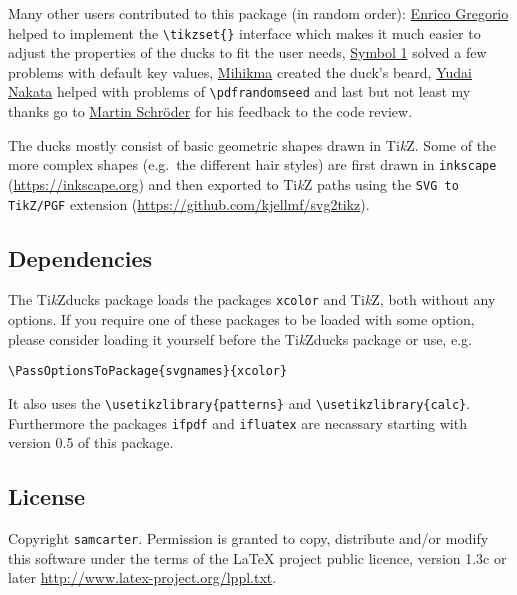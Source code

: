 \documentclass[parskip=half]{scrartcl}
\newcommand{\TikZ}{Ti\emph{k}Z\xspace}
\newcommand{\tikzducks}{Ti\emph{k}Zducks\xspace}
\begin{document}
Many other users contributed to this package (in random order):
%
\href{https://tex.stackexchange.com/users/4427/egreg}{Enrico Gregorio} helped to implement the \lstinline|\tikzset{}| interface which makes it much easier to adjust the properties of the ducks to fit the user needs,
%
\href{https://tex.stackexchange.com/users/51022/symbol-1}{Symbol 1}  solved a few problems with default key values,
%
\href{https://tex.stackexchange.com/users/148434/mihikma}{Mihikma} created the duck's beard,
%
\href{https://github.com/yudai-nkt}{Yudai Nakata} helped with problems of \lstinline|\pdfrandomseed|  
%
and last but not least my thanks go to \href{https://tex.stackexchange.com/users/5763/martin-schr%c3%b6der}{Martin Schr\"oder} for his feedback to the code review.

\pagebreak
The ducks mostly consist of basic geometric shapes drawn in \TikZ. Some of the more complex shapes (e.g.\ the different hair styles) are first drawn in \texttt{inkscape} (\url{https://inkscape.org}) and then exported to \TikZ paths using the \texttt{SVG to TikZ/PGF} extension (\url{https://github.com/kjellmf/svg2tikz}).

\subsection{Dependencies}

The \tikzducks package loads the packages \lstinline|xcolor| and \TikZ, both without any options. If you require one of these packages to be loaded with some option, please consider loading it yourself before the \tikzducks package or use, e.g.

\begin{lstlisting}[aboveskip=1.2em,morekeywords={xcolor,svgnames}]
	\PassOptionsToPackage{svgnames}{xcolor}
\end{lstlisting}
It also uses the \lstinline|\usetikzlibrary{patterns}| and \lstinline|\usetikzlibrary{calc}|. Furthermore the packages \lstinline|ifpdf| and \lstinline|ifluatex| are necassary starting with version 0.5 of this package.

\subsection{License}

Copyright 
\texttt{samcarter}. Permission is granted to copy, distribute and\slash or modify this software under the terms of the LaTeX project public licence, version 1.3c or later \url{http://www.latex-project.org/lppl.txt}.
\end{document}
